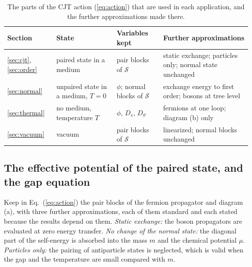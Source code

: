 \begin{table}
\caption{\label{tab:parts}The parts of the CJT action (\ref{eq:action}) that are used in each
application, and the further approximations made there.}
\begin{ruledtabular}
\begin{tabular}{>{\raggedright\arraybackslash}p{}>{\raggedright\arraybackslash}p{}>{\raggedright\arraybackslash}p{}>{\raggedright\arraybackslash}p{}}
Section & State & Variables kept & Further approximations \\
\hline
\ref{sec:cjt}, \ref{sec:order} & paired state in a medium & pair blocks of $\mathcal S$ & static exchange; particles only; normal state unchanged \\
\ref{sec:normal} & unpaired state in a medium, $T=0$ & $\phi$; normal blocks of $\mathcal S$ & exchange energy to first order; bosons at tree level \\
\ref{sec:thermal} & no medium, temperature $T$ & $\phi$, $D_s$, $D_\vartheta$ & fermions at one loop; diagram (b) only \\
\ref{sec:vacuum} & vacuum & pair blocks of $\mathcal S$ & linearized; normal blocks unchanged \\
\end{tabular}
\end{ruledtabular}
\end{table}

\subsection{The effective potential of the paired state, and the gap equation}
\label{sec:gapeq}

Keep in Eq.~(\ref{eq:action}) the pair blocks of the fermion propagator and diagram (a), with three
further approximations, each of them standard and each stated because the results depend on them.
\emph{Static exchange:} the boson propagators are evaluated at zero energy transfer. \emph{No change of
the normal state:} the diagonal part of the self-energy is absorbed into the mass $m$ and the chemical
potential $\mu$. \emph{Particles only:} the pairing of antiparticle states is neglected, which is valid
when the gap and the temperature are small compared with $m$.

